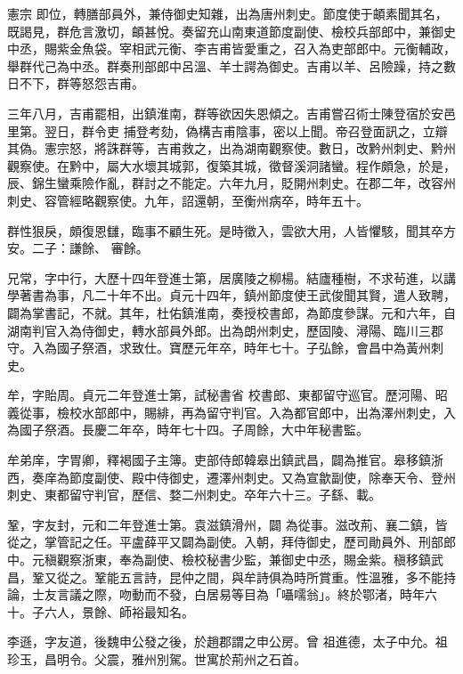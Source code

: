 \begin{pinyinscope}
 憲宗
 即位，轉膳部員外，兼侍御史知雜，出為唐州刺史。節度使于頔素聞其名，既謁見，群危言激切，頔甚悅。奏留充山南東道節度副使、檢校兵部郎中，兼御史中丞，賜紫金魚袋。宰相武元衡、李吉甫皆愛重之，召入為吏部郎中。元衡輔政，舉群代己為中丞。群奏刑部郎中呂溫、羊士諤為御史。吉甫以羊、呂險躁，持之數日不下，群等怒怨吉甫。



 三年八月，吉甫罷相，出鎮淮南，群等欲因失恩傾之。吉甫嘗召術士陳登宿於安邑里第。翌日，群令吏
 捕登考劾，偽構吉甫陰事，密以上聞。帝召登面訊之，立辯其偽。憲宗怒，將誅群等，吉甫救之，出為湖南觀察使。數日，改黔州刺史、黔州觀察使。在黔中，屬大水壞其城郭，復築其城，徵督溪洞諸蠻。程作頗急，於是，辰、錦生蠻乘險作亂，群討之不能定。六年九月，貶開州刺史。在郡二年，改容州刺史、容管經略觀察使。九年，詔還朝，至衡州病卒，時年五十。



 群性狠戾，頗復恩讎，臨事不顧生死。是時徵入，雲欲大用，人皆懼駭，聞其卒方安。二子：謙餘、
 審餘。



 兄常，字中行，大歷十四年登進士第，居廣陵之柳楊。結廬種樹，不求茍進，以講學著書為事，凡二十年不出。貞元十四年，鎮州節度使王武俊聞其賢，遣人致聘，闢為掌書記，不就。其年，杜佑鎮淮南，奏授校書郎，為節度參謀。元和六年，自湖南判官入為侍御史，轉水部員外郎。出為朗州刺史，歷固陵、潯陽、臨川三郡守。入為國子祭酒，求致仕。寶歷元年卒，時年七十。子弘餘，會昌中為黃州刺史。



 牟，字貽周。貞元二年登進士第，試秘書省
 校書郎、東都留守巡官。歷河陽、昭義從事，檢校水部郎中，賜緋，再為留守判官。入為都官郎中，出為澤州刺史，入為國子祭酒。長慶二年卒，時年七十四。子周餘，大中年秘書監。



 牟弟庠，字胃卿，釋褐國子主簿。吏部侍郎韓皋出鎮武昌，闢為推官。皋移鎮浙西，奏庠為節度副使、殿中侍御史，遷澤州刺史。又為宣歙副使，除奉天令、登州刺史、東都留守判官，歷信、婺二州刺史。卒年六十三。子繇、載。



 鞏，字友封，元和二年登進士第。袁滋鎮滑州，闢
 為從事。滋改荊、襄二鎮，皆從之，掌管記之任。平盧薛平又闢為副使。入朝，拜侍御史，歷司勛員外、刑部郎中。元稹觀察浙東，奉為副使、檢校秘書少監，兼御史中丞，賜金紫。稹移鎮武昌，鞏又從之。鞏能五言詩，昆仲之間，與牟詩俱為時所賞重。性溫雅，多不能持論，士友言議之際，吻動而不發，白居易等目為「囁嚅翁」。終於鄂渚，時年六十。子六人，景餘、師裕最知名。



 李遜，字友道，後魏申公發之後，於趙郡謂之申公房。曾
 祖進德，太子中允。祖珍玉，昌明令。父震，雅州別駕。世寓於荊州之石首。




\end{pinyinscope}
